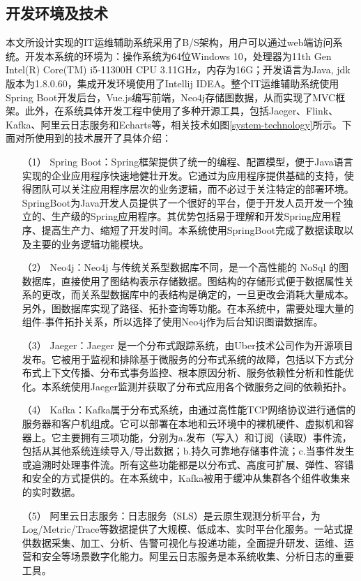 \subsection{开发环境及技术}
本文所设计实现的IT运维辅助系统采用了B/S架构，用户可以通过web端访问系统。开发本系统的环境为：操作系统为64位Windows 10，处理器为11th Gen Intel(R) Core(TM) i5-11300H CPU 3.11GHz，内存为16G；开发语言为Java, jdk版本为1.8.0.60，集成开发环境使用了Intellij IDEA。整个IT运维辅助系统使用Spring Boot开发后台，Vue.js编写前端，Neo4j存储图数据，从而实现了MVC框架。此外，在系统具体开发工程中使用了多种开源工具，包括Jaeger、Flink、Kafka、阿里云日志服务和Echarts等，相关技术如图\ref{system-technology}所示。下面对所使用到的技术展开了具体介绍：
\begin{itemize}
    \item [（1）]Spring Boot：Spring框架提供了统一的编程、配置模型，便于Java语言实现的企业应用程序快速地健壮开发。它通过为应用程序提供基础的支持，使得团队可以关注应用程序层次的业务逻辑，而不必过于关注特定的部署环境。SpringBoot为Java开发人员提供了一个很好的平台，便于开发人员开发一个独立的、生产级的Spring应用程序。其优势包括易于理解和开发Spring应用程序、提高生产力、缩短了开发时间。本系统使用SpringBoot完成了数据读取以及主要的业务逻辑功能模块。
    \item [（2）]Neo4j：Neo4j 与传统关系型数据库不同，是一个高性能的 NoSql 的图数据库，直接使用了图结构表示存储数据。图结构的存储形式便于数据属性关系的更改，而关系型数据库中的表结构是确定的，一旦更改会消耗大量成本。另外，图数据库实现了路径、拓扑查询等功能。在本系统中，需要处理大量的组件-事件拓扑关系，所以选择了使用Neo4j作为后台知识图谱数据库。
    \item [（3）]Jaeger：Jaeger 是一个分布式跟踪系统，由Uber技术公司作为开源项目发布。它被用于监视和排除基于微服务的分布式系统的故障，包括以下方式分布式上下文传播、分布式事务监控、根本原因分析、服务依赖性分析和性能优化。本系统使用Jaeger监测并获取了分布式应用各个微服务之间的依赖拓扑。
    \item [（4）]Kafka：Kafka属于分布式系统，由通过高性能TCP网络协议进行通信的服务器和客户机组成。它可以部署在本地和云环境中的裸机硬件、虚拟机和容器上。它主要拥有三项功能，分别为a.发布（写入）和订阅（读取）事件流，包括从其他系统连续导入/导出数据；b.持久可靠地存储事件流；c.当事件发生或追溯时处理事件流。所有这些功能都是以分布式、高度可扩展、弹性、容错和安全的方式提供的。在本系统中，Kafka被用于缓冲从集群各个组件收集来的实时数据。
    \item [（5）]阿里云日志服务：日志服务（SLS）是云原生观测分析平台，为Log/Metric/Trace等数据提供了大规模、低成本、实时平台化服务。一站式提供数据采集、加工、分析、告警可视化与投递功能，全面提升研发、运维、运营和安全等场景数字化能力。阿里云日志服务是本系统收集、分析日志的重要工具。

\end{itemize}
